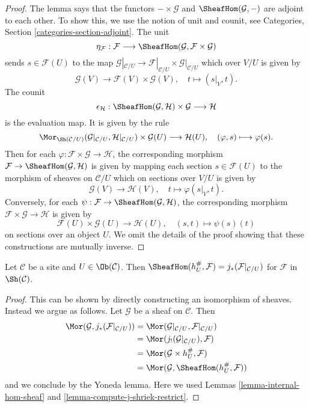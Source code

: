 \begin{proof}
The lemma says that the functors $-\times\mathcal{G}$ and
$\SheafHom(\mathcal{G},-)$ are adjoint to each other. 
To show this, we use the notion of unit and counit, see
Categories, Section \ref{categories-section-adjoint}.
The unit
$$
\eta_\mathcal{F} :
\mathcal{F}
\longrightarrow
\SheafHom(\mathcal{G},\mathcal{F}\times\mathcal{G})
$$
sends $s \in \mathcal{F}(U)$ to the map
$\mathcal{G}|_{\mathcal{C}/U} \to
\mathcal{F}|_{\mathcal{C}/U}\times\mathcal{G}|_{\mathcal{C}/U}$
which over $V/U$ is given by
$$
\mathcal{G}(V) \longrightarrow \mathcal{F}(V)\times \mathcal{G}(V), \quad
t \longmapsto (s|_{V},t).
$$
The counit
$$
\epsilon_{\mathcal{H}} :
\SheafHom(\mathcal{G}, \mathcal{H}) \times \mathcal{G}
\longrightarrow
\mathcal{H}
$$
is the evaluation map. It is given by the rule
$$
\Mor_{\Sh(\mathcal{C}/U)}(
\mathcal{G}|_{\mathcal{C}/U}, \mathcal{H}|_{\mathcal{C}/U})
\times \mathcal{G}(U)
\longrightarrow
\mathcal{H}(U),\quad
(\varphi, s) \longmapsto \varphi(s).
$$
Then for each $\varphi : \mathcal{F} \times \mathcal{G} \to \mathcal{H}$,
the corresponding morphism
$\mathcal{F} \to \SheafHom(\mathcal{G},\mathcal{H})$
is given by mapping each section $s \in \mathcal{F}(U)$
to the morphism of sheaves on $\mathcal{C}/U$ which on
sections over $V/U$ is given by
$$
\mathcal{G}(V) \longrightarrow \mathcal{H}(V),\quad
t \longmapsto \varphi(s|_V, t).
$$
Conversely, for each
$\psi : \mathcal{F} \to \SheafHom(\mathcal{G}, \mathcal{H})$,
the corresponding morphism
$\mathcal{F} \times \mathcal{G} \to \mathcal{H}$ is given by
$$
\mathcal{F}(U) \times \mathcal{G}(U) \longrightarrow \mathcal{H}(U),\quad
(s, t) \longmapsto \psi(s)(t)
$$
on sections over an object $U$. We omit the details of the proof showing
that these constructions are mutually inverse.
\end{proof}

\begin{lemma}
\label{lemma-hom-sheaf-hU}
Let $\mathcal{C}$ be a site and $U \in \Ob(\mathcal{C})$.
Then $\SheafHom(h_U^\#, \mathcal{F}) = j_*(\mathcal{F}|_{\mathcal{C}/U})$
for $\mathcal{F}$ in $\Sh(\mathcal{C})$.
\end{lemma}

\begin{proof}
This can be shown by directly constructing an isomorphism
of sheaves. Instead we argue as follows.
Let $\mathcal{G}$ be a sheaf on $\mathcal{C}$.
Then
\begin{align*}
\Mor(\mathcal{G}, j_*(\mathcal{F}|_{\mathcal{C}/U}))
& =
\Mor(\mathcal{G}|_{\mathcal{C}/U}, \mathcal{F}|_{\mathcal{C}/U}) \\
& =
\Mor(j_!(\mathcal{G}|_{\mathcal{C}/U}), \mathcal{F}) \\
& =
\Mor(\mathcal{G} \times h_U^\#, \mathcal{F}) \\
& =
\Mor(\mathcal{G}, \SheafHom(h_U^\#, \mathcal{F}))
\end{align*}
and we conclude by the Yoneda lemma. Here we used
Lemmas \ref{lemma-internal-hom-sheaf} and
\ref{lemma-compute-j-shriek-restrict}.
\end{proof}

